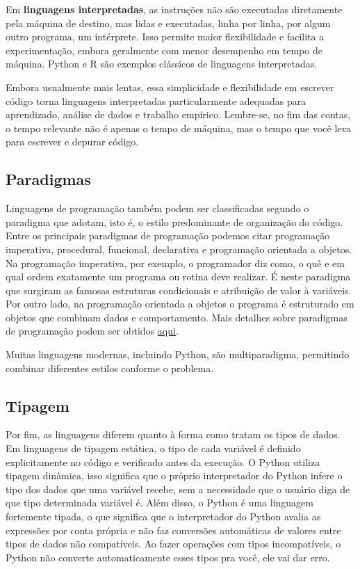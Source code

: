 \documentclass[
  brazilian,
  letterpaper,
  DIV=11,
  numbers=noendperiod]{scrreprt}
\begin{document}
Em \textbf{linguagens interpretadas}, as instruções não são executadas
diretamente pela máquina de destino, mas lidas e executadas, linha por
linha, por algum outro programa, um intérprete. Isso permite maior
flexibilidade e facilita a experimentação, embora geralmente com menor
desempenho em tempo de máquina. Python e R são exemplos clássicos de
linguagens interpretadas.

Embora usualmente mais lentas, essa simplicidade e flexibilidade em
escrever código torna linguagens interpretadas particularmente adequadas
para aprendizado, análise de dados e trabalho empírico. Lembre-se, no
fim das contas, o tempo relevante não é apenas o tempo de máquina, mas o
tempo que você leva para escrever e depurar código.

\subsection{Paradigmas}\label{paradigmas}

Linguagens de programação também podem ser classificadas segundo o
paradigma que adotam, isto é, o estilo predominante de organização do
código. Entre os principais paradigmas de programação podemos citar
programação imperativa, procedural, funcional, declarativa e programação
orientada a objetos. Na programação imperativa, por exemplo, o
programador diz como, o quê e em qual ordem exatamente um programa ou
rotina deve realizar. É neste paradigma que surgiram as famosas
estruturas condicionais e atribuição de valor à variáveis. Por outro
lado, na programação orientada a objetos o programa é estruturado em
objetos que combinam dados e comportamento. Mais detalhes sobre
paradigmas de programação podem ser obtidos
\href{https://www.freecodecamp.org/news/an-introduction-to-programming-paradigms/\#what-is-a-programming-paradigm}{aqui}.

Muitas linguagens modernas, incluindo Python, são multiparadigma,
permitindo combinar diferentes estilos conforme o problema.

\subsection{Tipagem}\label{tipagem}

Por fim, as linguagens diferem quanto à forma como tratam os tipos de
dados. Em linguagens de tipagem estática, o tipo de cada variável é
definido explicitamente no código e verificado antes da execução. O
Python utiliza tipagem dinâmica, isso significa que o próprio
interpretador do Python infere o tipo dos dados que uma variável recebe,
sem a necessidade que o usuário diga de que tipo determinada variável é.
Além disso, o Python é uma linguagem fortemente tipada, o que significa
que o interpretador do Python avalia as expressões por conta própria e
não faz conversões automáticas de valores entre tipos de dados não
compatíveis. Ao fazer operações com tipos incompatíveis, o Python não
converte automaticamente esses tipos pra você, ele vai dar erro.
\end{document}
